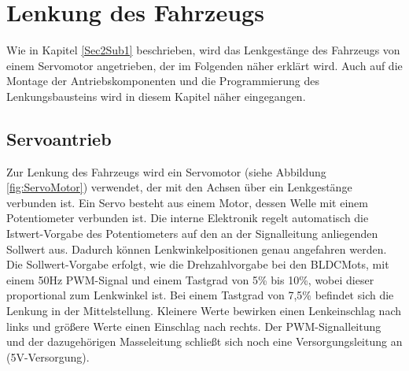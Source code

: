 

\pagestyle{fancy}
\rhead{\thepage} \chead{} 
\cfoot{}

\section{Lenkung des Fahrzeugs}\label{Sec5}

Wie in Kapitel \ref{Sec2Sub1} beschrieben, wird das Lenkgestänge des Fahrzeugs von einem Servomotor angetrieben, der im Folgenden näher erklärt wird. Auch auf die Montage der Antriebskomponenten und die Programmierung des Lenkungsbausteins wird in diesem Kapitel näher eingegangen.

\subsection{Servoantrieb}\label{Sec5Sub1}

Zur Lenkung des Fahrzeugs wird ein Servomotor (siehe Abbildung \ref{fig:ServoMotor}) verwendet, der mit den Achsen über ein Lenkgestänge verbunden ist. Ein Servo besteht aus einem Motor, dessen Welle mit einem Potentiometer verbunden ist. Die interne Elektronik regelt automatisch die Istwert-Vorgabe des Potentiometers auf den an der Signalleitung anliegenden Sollwert aus. Dadurch können Lenkwinkelpositionen genau angefahren werden. Die Sollwert-Vorgabe erfolgt, wie die Drehzahlvorgabe bei den \acp{BLDCMot}, mit einem 50Hz \ac{PWM}-Signal und einem Tastgrad von 5\% bis 10\%, wobei dieser proportional zum Lenkwinkel ist. Bei einem Tastgrad von 7,5\% befindet sich die Lenkung in der Mittelstellung. Kleinere Werte bewirken einen Lenkeinschlag nach links und größere Werte einen Einschlag nach rechts. Der \ac{PWM}-Signalleitung und der dazugehörigen Masseleitung schließt sich noch eine Versorgungsleitung an (5V-Versorgung).

